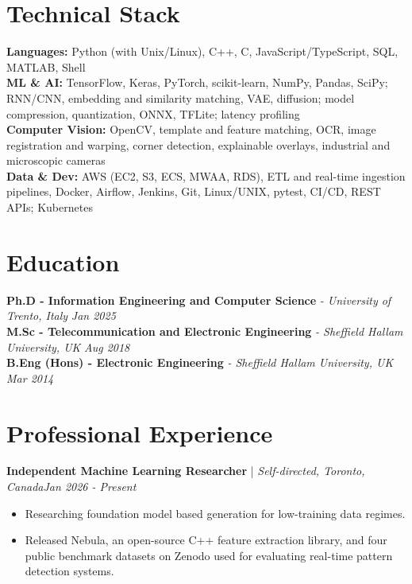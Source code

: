 \documentclass[11pt]{article}
\newenvironment{cvrole}[5]{%
  \par\noindent\textbf{\large #1} | \textit{\small #2, #3}\hfill \textit{\small #4 - #5}\par
  \begin{itemize}[leftmargin=2em, itemsep=-0.3em, topsep=-0.5em]%
}{%
  \end{itemize}\par\noindent\mbox{}\par\vspace{0.1em}%
}
\begin{document}
\section*{Technical Stack}

\textbf{Languages:} Python (with Unix/Linux), C++, C, JavaScript/TypeScript, SQL, MATLAB, Shell\\
\textbf{ML \& AI:} TensorFlow, Keras, PyTorch, scikit-learn, NumPy, Pandas, SciPy; RNN/CNN, embedding and similarity matching, VAE, diffusion; model compression, quantization, ONNX, TFLite; latency profiling\\
\textbf{Computer Vision:} OpenCV, template and feature matching, OCR, image registration and warping, corner detection, explainable overlays, industrial and microscopic cameras\\
\textbf{Data \& Dev:} AWS (EC2, S3, ECS, MWAA, RDS), ETL and real-time ingestion pipelines, Docker, Airflow, Jenkins, Git, Linux/UNIX, pytest, CI/CD, REST APIs; Kubernetes

\section*{Education}
\textbf{Ph.D - Information Engineering and Computer Science} \textit{\small{ - University of Trento, Italy}} \hfill \textit{Jan 2025}\\[2pt]
\noindent\textbf{M.Sc - Telecommunication and Electronic Engineering} \textit{\small{ - Sheffield Hallam University, UK}} \hfill \textit{Aug 2018}\\[2pt]
\noindent\textbf{B.Eng (Hons) - Electronic Engineering} \textit{\small{ - Sheffield Hallam University, UK}} \hfill \textit{Mar 2014}

\section*{Professional Experience}

\begin{cvrole}{Independent Machine Learning Researcher}{Self-directed}{Toronto, Canada}{Jan 2026}{Present}
    \item Researching foundation model based generation for low-training data regimes.
    \item Released Nebula, an open-source C++ feature extraction library, and four public benchmark datasets on Zenodo used for evaluating real-time pattern detection systems. 
\end{cvrole}
\end{document}

